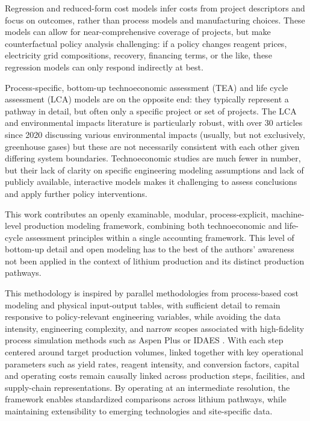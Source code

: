 \documentclass{article}
\renewcommand\_{\textunderscore\allowbreak}
\begin{document}
Regression and reduced-form cost models \citep[e.g.,][]{ambroseUnderstandingFutureLithium2020b, flemingLongrunAvailabilityMineral2024, buschEffectsDemandRecycling2025} infer costs from project descriptors and focus on outcomes, rather than process models and manufacturing choices. These models can allow for near-comprehensive coverage of projects, but make counterfactual policy analysis challenging: if a policy changes reagent prices, electricity grid compositions, recovery, financing terms, or the like, these regression models can only respond indirectly at best.

Process-specific, bottom-up technoeconomic assessment (TEA) and life cycle assessment (LCA) models are on the opposite end: they typically represent a pathway in detail, but often only a specific project or set of projects. The LCA and environmental impacts literature is particularly robust, with over 30 articles since 2020 discussing various environmental impacts (usually, but not exclusively, greenhouse gases) but these are not necessarily consistent with each other given differing system boundaries. Technoeconomic studies are much fewer in number, but their lack of clarity on specific engineering modeling assumptions and lack of publicly available, interactive models makes it challenging to assess conclusions and apply further policy interventions.

This work contributes an openly examinable, modular, process-explicit, machine-level production modeling framework, combining both technoeconomic and life-cycle assessment principles within a single accounting framework. This level of bottom-up detail and open modeling has to the best of the authors' awareness not been applied in the context of lithium production and its distinct production pathways.

This methodology is inspired by parallel methodologies from process-based cost modeling and physical input-output tables, with sufficient detail to remain responsive to policy-relevant engineering variables, while avoiding the data intensity, engineering complexity, and narrow scopes associated with high-fidelity process simulation methods such as Aspen Plus or IDAES \cite{leeIDAESProcessModeling2021}. With each step centered around target production volumes, linked together with key operational parameters such as yield rates, reagent intensity, and conversion factors, capital and operating costs remain causally linked across production steps, facilities, and supply-chain representations. By operating at an intermediate resolution, the framework enables standardized comparisons across lithium pathways, while maintaining extensibility to emerging technologies and site-specific data.
\end{document}
